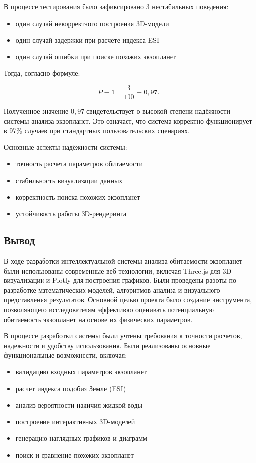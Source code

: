 В процессе тестирования было зафиксировано 3 нестабильных поведения:
\begin{itemize}
    \item один случай некорректного построения 3D-модели
    \item один случай задержки при расчете индекса ESI
    \item один случай ошибки при поиске похожих экзопланет
\end{itemize}

Тогда, согласно формуле:

\begin{equation}
P = 1 - \frac{3}{100} = 0{,}97. \label{eq:reliability-result}
\end{equation}

Полученное значение $0{,}97$ свидетельствует о высокой степени надёжности системы анализа экзопланет. Это означает, что система корректно функционирует в 97\% случаев при стандартных пользовательских сценариях.

Основные аспекты надёжности системы:
\begin{itemize}
    \item точность расчета параметров обитаемости
    \item стабильность визуализации данных
    \item корректность поиска похожих экзопланет
    \item устойчивость работы 3D-рендеринга
\end{itemize}

\newpage
\subsection{Вывод}

В ходе разработки интеллектуальной системы анализа обитаемости экзопланет были использованы современные веб-технологии, включая Three.js для 3D-визуализации и Plotly для построения графиков. Были проведены работы по разработке математических моделей, алгоритмов анализа и визуального представления результатов. Основной целью проекта было создание инструмента, позволяющего исследователям эффективно оценивать потенциальную обитаемость экзопланет на основе их физических параметров.

В процессе разработки системы были учтены требования к точности расчетов, надежности и удобству использования. Были реализованы основные функциональные возможности, включая:
\begin{itemize}
    \item валидацию входных параметров экзопланет
    \item расчет индекса подобия Земле (ESI)
    \item анализ вероятности наличия жидкой воды
    \item построение интерактивных 3D-моделей
    \item генерацию наглядных графиков и диаграмм
    \item поиск и сравнение похожих экзопланет
\end{itemize}

